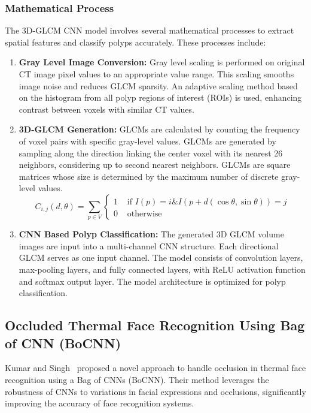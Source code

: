 \documentclass[journal, biblatex]{IEEEtran}
\begin{document}
\subsubsection{Mathematical Process}
The 3D-GLCM CNN model involves several mathematical processes to extract spatial features and classify polyps accurately. These processes include:
\begin{enumerate}
    \item \textbf{Gray Level Image Conversion:} Gray level scaling is performed on original CT image pixel values to an appropriate value range. This scaling smooths image noise and reduces GLCM sparsity. An adaptive scaling method based on the histogram from all polyp regions of interest (ROIs) is used, enhancing contrast between voxels with similar CT values.
    
    \item \textbf{3D-GLCM Generation:} GLCMs are calculated by counting the frequency of voxel pairs with specific gray-level values. GLCMs are generated by sampling along the direction linking the center voxel with its nearest 26 neighbors, considering up to second nearest neighbors. GLCMs are square matrices whose size is determined by the maximum number of discrete gray-level values.
    \begin{equation*}
        C_{i, j}(d, \theta)=\sum_{p \in V} \begin{cases}1 & \text { if } I(p)=i \& I(p+d(\cos \theta, \sin \theta))=j \\ 0 & \text { otherwise }\end{cases}
    \end{equation*}
    
    \item \textbf{CNN Based Polyp Classification:} The generated 3D GLCM volume images are input into a multi-channel CNN structure. Each directional GLCM serves as one input channel. The model consists of convolution layers, max-pooling layers, and fully connected layers, with ReLU activation function and softmax output layer. The model architecture is optimized for polyp classification.
\end{enumerate}

\subsection{Occluded Thermal Face Recognition Using Bag of CNN (BoCNN)}
Kumar and Singh~\cite{kumar2020} proposed a novel approach to handle occlusion in thermal face recognition using a Bag of CNNs (BoCNN). Their method leverages the robustness of CNNs to variations in facial expressions and occlusions, significantly improving the accuracy of face recognition systems.
\end{document}
